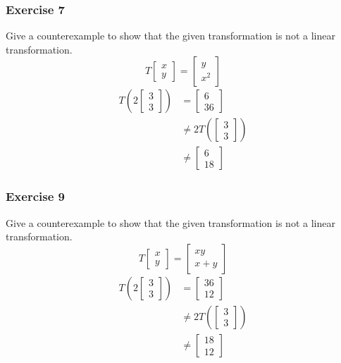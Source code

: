 \documentclass[letterpaper, 12pt]{math}
\begin{document}
\subsubsection*{Exercise 7}
Give a counterexample to show that the given transformation is not a linear
transformation.
\[ T\begin{bmatrix}x \\ y\end{bmatrix} = \begin{bmatrix}y \\ x^2\end{bmatrix} \]
\begin{align*}
  T\left(2\begin{bmatrix}3 \\ 3\end{bmatrix}\right) &=
    \begin{bmatrix}6 \\ 36\end{bmatrix} \\
  &\ne 2T\left(\begin{bmatrix}3 \\ 3\end{bmatrix}\right) \\
  &\ne \begin{bmatrix}6 \\ 18\end{bmatrix}
\end{align*}

\subsubsection*{Exercise 9}
Give a counterexample to show that the given transformation is not a linear
transformation.
\[ T\begin{bmatrix}x \\ y\end{bmatrix} =
  \begin{bmatrix}xy \\ x+y\end{bmatrix} \]
\begin{align*}
  T\left(2\begin{bmatrix}3 \\ 3\end{bmatrix}\right) &=
    \begin{bmatrix}36 \\ 12\end{bmatrix} \\
  &\ne 2T\left(\begin{bmatrix}3 \\ 3\end{bmatrix}\right) \\
  &\ne \begin{bmatrix}18 \\ 12\end{bmatrix}
\end{align*}
\end{document}
